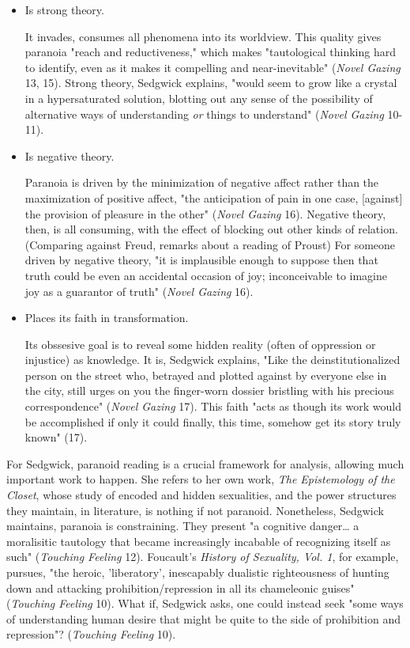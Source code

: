 \documentclass[11pt]{article}
\begin{document}
\begin{enumerate}
\begin{itemize}
\item Is strong theory.

It invades, consumes all phenomena into its worldview. This quality
gives paranoia "reach and reductiveness," which makes "tautological
thinking hard to identify, even as it makes it compelling and
near-inevitable" (\emph{Novel Gazing} 13, 15). Strong theory, Sedgwick
explains, "would seem to grow like a crystal in a hypersaturated
solution, blotting out any sense of the possibility of alternative
ways of understanding \emph{or} things to understand" (\emph{Novel Gazing}
10-11).

\item Is negative theory.

Paranoia is driven by the minimization of negative affect rather
than the maximization of positive affect, "the anticipation of pain
in one case, [against] the provision of pleasure in the other"
(\emph{Novel Gazing} 16). Negative theory, then, is all consuming, with
the effect of blocking out other kinds of relation. (Comparing
against Freud, remarks about a reading of Proust) For someone driven
by negative theory, "it is implausible enough to suppose then that
truth could be even an accidental occasion of joy; inconceivable to
imagine joy as a guarantor of truth" (\emph{Novel Gazing} 16).

\item Places its faith in transformation.

Its obssesive goal is to reveal some hidden reality (often of
oppression or injustice) as knowledge. It is, Sedgwick explains,
"Like the deinstitutionalized person on the street who, betrayed and
plotted against by everyone else in the city, still urges on you the
finger-worn dossier bristling with his precious correspondence"
(\emph{Novel Gazing} 17). This faith "acts as though its work would be
accomplished if only it could finally, this time, somehow get its
story truly known" (17).
\end{itemize}

For Sedgwick, paranoid reading is a crucial framework for analysis,
allowing much important work to happen. She refers to her own work,
\emph{The Epistemology of the Closet}, whose study of encoded and hidden
sexualities, and the power structures they maintain, in literature, is
nothing if not paranoid. Nonetheless, Sedgwick maintains, paranoia is
constraining. They present "a cognitive danger\ldots{} a moralisitic
tautology that became increasingly incabable of recognizing itself as
such" (\emph{Touching Feeling} 12). Foucault's \emph{History of Sexuality, Vol.
1}, for example, pursues, "the heroic, 'liberatory', inescapably
dualistic righteousness of hunting down and attacking
prohibition/repression in all its chameleonic guises" (\emph{Touching
Feeling} 10). What if, Sedgwick asks, one could instead seek "some
ways of understanding human desire that might be quite to the side of
prohibition and repression"? (\emph{Touching Feeling} 10).


\end{enumerate}
\end{document}

